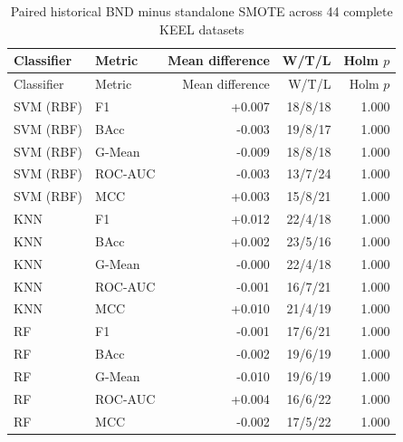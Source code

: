 \begingroup\small\setlength{\tabcolsep}{3pt}
\begin{longtable}{@{}llrrr@{}}
\caption{Paired historical BND minus standalone SMOTE across 44 complete KEEL datasets}\label{tab:5}\\
\toprule
Classifier & Metric & Mean difference & W/T/L & Holm $p$ \\
\midrule
\endfirsthead
\toprule
Classifier & Metric & Mean difference & W/T/L & Holm $p$ \\
\midrule
\endhead
\bottomrule
\endlastfoot
SVM (RBF) & F1 & +0.007 & 18/8/18 & 1.000 \\
SVM (RBF) & BAcc & -0.003 & 19/8/17 & 1.000 \\
SVM (RBF) & G-Mean & -0.009 & 18/8/18 & 1.000 \\
SVM (RBF) & ROC-AUC & -0.003 & 13/7/24 & 1.000 \\
SVM (RBF) & MCC & +0.003 & 15/8/21 & 1.000 \\
KNN & F1 & +0.012 & 22/4/18 & 1.000 \\
KNN & BAcc & +0.002 & 23/5/16 & 1.000 \\
KNN & G-Mean & -0.000 & 22/4/18 & 1.000 \\
KNN & ROC-AUC & -0.001 & 16/7/21 & 1.000 \\
KNN & MCC & +0.010 & 21/4/19 & 1.000 \\
RF & F1 & -0.001 & 17/6/21 & 1.000 \\
RF & BAcc & -0.002 & 19/6/19 & 1.000 \\
RF & G-Mean & -0.010 & 19/6/19 & 1.000 \\
RF & ROC-AUC & +0.004 & 16/6/22 & 1.000 \\
RF & MCC & -0.002 & 17/5/22 & 1.000 \\
\end{longtable}
\endgroup

